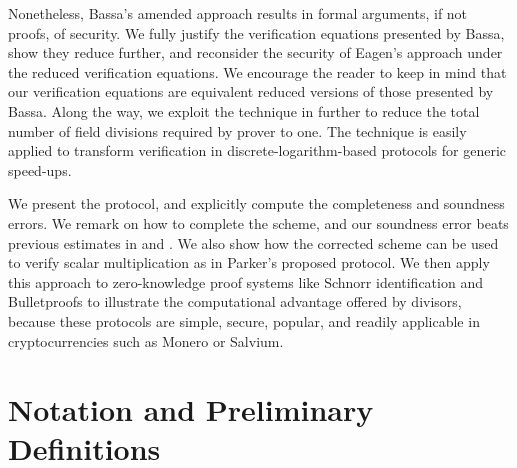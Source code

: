 \documentclass[11pt,letterpaper]{article}
\theoremstyle{definition}
\newcommand{\6}{\mathbf}
\newcommand{\7}{\mathcal}
\begin{document}
Nonetheless, Bassa's amended approach results in formal arguments, if not proofs, of security. We fully justify the verification equations presented by Bassa, show they reduce further, and reconsider the security of Eagen's approach under the reduced verification equations. We encourage the reader to keep in mind that our verification equations are equivalent reduced versions of those presented by Bassa. Along the way, we exploit the technique in \cite{Eagen} further to reduce the total number of field divisions required by prover to one. The technique is easily applied to transform verification in 
discrete-logarithm-based protocols for generic speed-ups.

We present the protocol, and explicitly compute the completeness and soundness errors. We remark on how to complete the scheme, and our soundness error beats previous estimates in \cite{Eagen} and \cite{SoundnessForDLP}.
We also show how the corrected scheme can be used to verify scalar multiplication as in Parker's proposed protocol.
We then apply this approach to zero-knowledge proof systems like Schnorr identification and Bulletproofs to illustrate the computational advantage offered by divisors, because these protocols are simple, secure, popular, and readily applicable in cryptocurrencies such as Monero or Salvium. 



\section{Notation and Preliminary Definitions}
\end{document}
